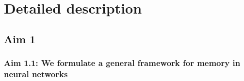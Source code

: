 \documentclass[12pt,letterpaper, onecolumn]{article}
\theoremstyle{definition}
\theoremstyle{remark}
\begin{document}



\newpage
\section{Detailed description}
\subsection*{Aim 1}

\subsubsection*{Aim 1.1: We formulate a general framework for memory in neural networks}

\end{document}
